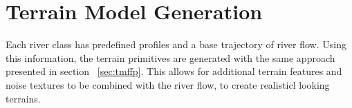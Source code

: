 \section{Terrain Model Generation}
Each river class has predefined profiles and a base trajectory of river flow. Using this information, the terrain primitives are generated with the same approach presented in section ~\ref{sec:tmffp}. This allows for additional terrain features and noise textures to be combined with the river flow, to create realisticl looking terrains. 
